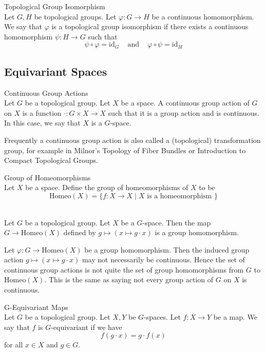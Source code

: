 \documentclass[a4paper]{article}
\begin{document}
\begin{defn}{Topological Group Isomorphism}{}\\
Let $G,H$ be topological groups. Let $\varphi:G\to H$ be a continuous homomorphism. We say that $\varphi$ is a topological group isomorphism if there exists a continuous homomorphism $\psi:H\to G$ such that $$\psi\circ\varphi=\text{id}_G\;\;\;\text{ and }\;\;\;\varphi\circ\psi=\text{id}_H$$
\end{defn}

\subsection{Equivariant Spaces}
\begin{defn}{Continuous Group Actions}{}\\
Let $G$ be a topological group. Let $X$ be a space. A continuous group action of $G$ on $X$ is a function $\cdot:G\times X\to X$ such that it is a group action and is continuous. In this case, we say that $X$ is a $G$-space. 
\end{defn}

Frequently a continuous group action is also called a (topological) transformation group, for example in Milnor's Topology of Fiber Bundles or Introduction to Compact Topological Groups. 

\begin{defn}{Group of Homeomorphisms}{}\\
Let $X$ be a space. Define the group of homeomorphisms of $X$ to be $$\text{Homeo}(X)=\{f:X\to X\;|\;X\text{ is a homeomorphism }\}$$
\end{defn}

\begin{prp}{}{}\\
Let $G$ be a topological group. Let $X$ be a $G$-space. Then the map $G\to\text{Homeo}(X)$ defined by $g\mapsto(x\mapsto g\cdot x)$ is a group homomorphism. 
\end{prp}

Let $\varphi:G\to\text{Homeo}(X)$ be a group homomorphism. Then the induced group action $g\mapsto(x\mapsto g\cdot x)$ may not necessarily be continuous. Hence the set of continuous group actions is not quite the set of group homomorphisms from $G$ to $\text{Homeo}(X)$. This is the same as saying not every group action of $G$ on $X$ is continuous. 

\begin{defn}{G-Equivariant Maps}{}\\
Let $G$ be a topological group. Let $X,Y$ be $G$-spaces. Let $f:X\to Y$ be a map. We say that $f$ is $G$-equivariant if we have $$f(g\cdot x)=g\cdot f(x)$$ for all $x\in X$ and $g\in G$. 
\end{defn}
\end{document}
